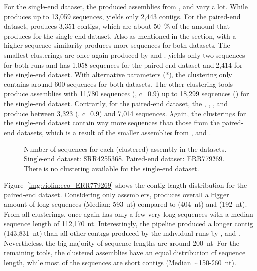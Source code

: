 \documentclass[12pt,a4paper,english]{article}
\begin{document}
	For the single-end dataset, the produced assemblies from \spades, \trinity and \soap vary a lot. While \soap produces up to 13,059 sequences, \trinity yields only 2,443 contigs. For the paired-end dataset, \spades produces 3,351 contigs, which are about 50~\% of the amount that \spades produces for the single-end dataset.
	Also as mentioned in the \celegans section, \cdhit with a higher sequence similarity produces more sequences for both \ecoli datasets. The smallest clusterings are once again produced by \grouper and \karma. \grouper yields only two sequences for both runs and \karma has 1,058 sequences for the paired-end dataset and 2,414 for the single-end dataset. With alternative parameters (\karma{}*), the clustering only contains around 600 sequences for both datasets.
	The other clustering tools produce assemblies with 11,780 sequences (\cdhit, c=0.9) up to 18,299 sequences (\mclusttwo) for the single-end dataset.
	Contrarily, for the paired-end dataset, the \orp, \cdhit, \linclust, \mclust and \mclusttwo produce between 3,323 (\cdhit, c=0.9) and  7,014 sequences.
	Again, the clusterings for the single-end dataset contain way more sequences than those from the paired-end datasets, which is a result of the smaller assemblies from \spades, \soap and \trinity.

	\begin{figure}[H]
		\centering
		\def\svgwidth{\textwidth}
		
		\caption[Number of sequences for each (clustered) assembly in the \ecoli datasets.]{Number of sequences for each (clustered) assembly in the \ecoli datasets. Single-end dataset: SRR4255368. Paired-end dataset: ERR779269. There is no \orp clustering available for the single-end dataset.}
		\label{img:barcharts:ecos}
	\end{figure}
	
    Figure~\ref{img:violin:eco_ERR779269} shows the contig length distribution for the paired-end \ecoli dataset.
	Considering only assemblers, \trinity produces overall a bigger amount of long sequences (Median: 593~nt) compared to \soap (404~nt) and \spades (192~nt).
	From all clusterings, \grouper once again has only a few very long sequences with a median sequence length of 112,170~nt.
	Interestingly, the \orp pipeline produced a longer contig (143,831~nt) than all other contigs produced by the individual runs by \spades, \soap and \trinity. Nevertheless, the big majority of sequence lengths are around 200~nt.
	For the remaining tools, the clustered assemblies have an equal distribution of sequence length, while most of the sequences are short contigs (Median $\sim$150-260~nt).
\end{document}
